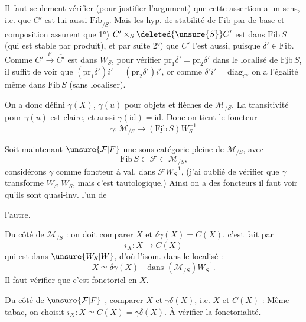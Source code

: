 Il faut seulement vérifier  (pour justifier l'argument) que cette assertion a un sens, i.e. que $\overline{C'}$ est lui aussi  $\underline{\mathrm{Fib}}_{/S}$. Mais les hyp. de stabilité de $\mathrm{Fib}$\unsure{-} par  de base et composition assurent que 1°) $C'\times_S \deleted{\unsure{S}}C'$ est dans $\underline{\mathrm{Fib}}\,S$ (qui est stable par produit), et par suite 2°) que $\overline{C'}$ l'est aussi, puisque $\delta'\in\mathrm{Fib}$.
Comme  $C'\xrightarrow{i'}\overline{C'}$ est dans $W_S$, pour vérifier $\mathrm{pr}_1\delta'=\mathrm{pr}_2\delta'$ dans le localisé de $\underline{\mathrm{Fib}}\,S$, il suffit de voir que $(\mathrm{pr}_1\delta')i'=(\mathrm{pr}_2\delta')i'$, or comme $\delta'i'=\mathrm{diag}_{C'}$ on a l'égalité même dans $\underline{\mathrm{Fib}}\,S$ (sans localiser).

On a donc défini $\gamma(X)$, $\gamma(u)$ pour objets et flèches de  $\mathcal M_{/S}$. La transitivité pour $\gamma(u)$ est claire, et aussi $\gamma(\mathrm{id})=\mathrm{id}$. Donc on tient le foncteur
\[
\gamma:\mathcal M_{/S}\longrightarrow(\underline{\mathrm{Fib}}\,S)W_S^{-1}
\]

Soit maintenant $\unsure{\mathcal F|F}$ une sous-catégorie pleine de $\mathcal M_{/S}$, avec
\[
\underline{\mathrm{Fib}}\,S\subset\mathcal F\subset\mathcal M_{/S}\text{,}
\]
considérons $\gamma$ comme foncteur à val. dans $\mathcal F W_S^{-1}$, (j'ai oublié de vérifier que $\gamma$ transforme $W_S$  $W_S$, mais c'est tautologique.) Ainsi on a des foncteurs
il faut voir qu'ils sont quasi-inv. l'un de

l'autre.

Du côté de $\mathcal M_{/S}$ : on doit comparer $X$ et $\delta\gamma(X)=C(X)$, c'est fait par
\[
i_X:X\longrightarrow C(X)
\]
qui est dans $\unsure{W_S|W}$, d'où l'isom. dans le localisé :
\[
X\simeq\delta\gamma(X)\quad\text{dans }(\mathcal M_{/S})W_S^{-1}\text{.}
\]
Il faut vérifier que c'est fonctoriel en $X$.

Du côté de $\unsure{\mathcal F|F}$ , comparer $X$ et $\gamma\delta(X)$, i.e. $X$ et $C(X)$ : Même tabac, on choisit $i_X:X\simeq C(X)=\gamma\delta(X)$. À vérifier la fonctorialité.

